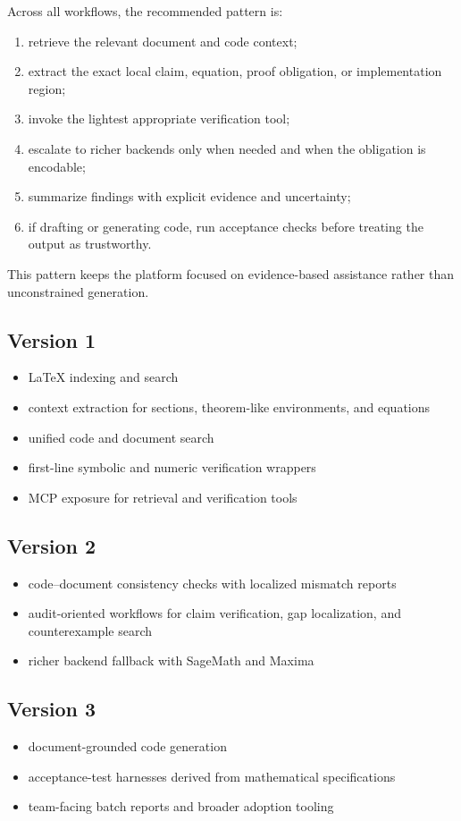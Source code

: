 Across all workflows, the recommended pattern is:
\begin{enumerate}[label=\arabic*.]
  \item retrieve the relevant document and code context;
  \item extract the exact local claim, equation, proof obligation, or implementation region;
  \item invoke the lightest appropriate verification tool;
  \item escalate to richer backends only when needed and when the obligation is encodable;
  \item summarize findings with explicit evidence and uncertainty;
  \item if drafting or generating code, run acceptance checks before treating the output as trustworthy.
\end{enumerate}

This pattern keeps the platform focused on evidence-based assistance rather than unconstrained generation.

\subsection*{Version 1}
\begin{itemize}
  \item LaTeX indexing and search
  \item context extraction for sections, theorem-like environments, and equations
  \item unified code and document search
  \item first-line symbolic and numeric verification wrappers
  \item MCP exposure for retrieval and verification tools
\end{itemize}

\subsection*{Version 2}
\begin{itemize}
  \item code--document consistency checks with localized mismatch reports
  \item audit-oriented workflows for claim verification, gap localization, and counterexample search
  \item richer backend fallback with SageMath and Maxima
\end{itemize}

\subsection*{Version 3}
\begin{itemize}
  \item document-grounded code generation
  \item acceptance-test harnesses derived from mathematical specifications
  \item team-facing batch reports and broader adoption tooling
\end{itemize}
